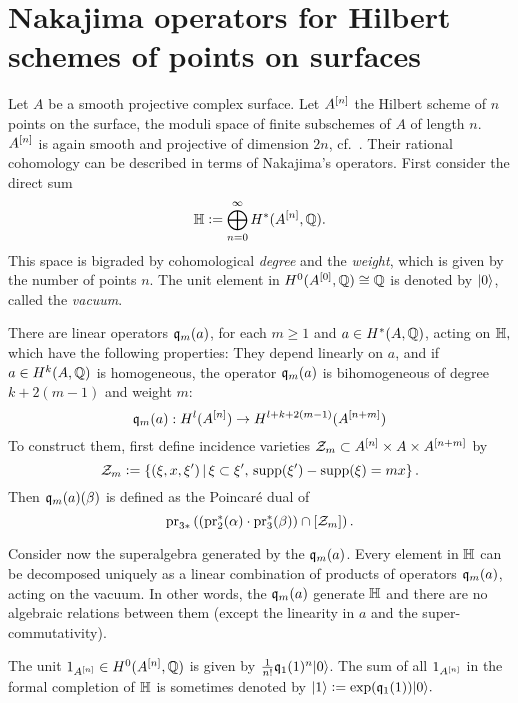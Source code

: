 \section[Nakajima operators for Hilbert schemes of points on surfaces]{Nakajima operators for Hilbert schemes of points on surfaces%
}
\label{Section_Hilbert}
Let $A$ be a smooth projective complex surface. 
Let $A^{[n]}$ the Hilbert scheme of $n$ points on the surface, \ie the moduli space of finite subschemes of $A$ of length $n$.
$A^{[n]}$ is again smooth and projective of dimension $2n$, cf.~\cite{Fogarty}. 
Their rational cohomology can be described in terms of Nakajima's \cite{Nakajima} operators. First consider the direct sum
$$
\mathbb{H} \vcentcolon=  \bigoplus_{n=0}^{\infty} H^*(A^{[n]},\mathbb{Q}).
$$
This space is bigraded by cohomological \emph{degree} and the \emph{weight}, which is given by the number of points $n$. The unit element in $H^0(A^{[0]},\mathbb{Q}) \cong \mathbb{Q}$ is denoted by $|0\rangle$, called the \emph{vacuum}.
\begin{defipro}
There are linear operators $\mathfrak{q}_m(a)$, for each $m\geq 1$ and $a \in H^*(A,\mathbb{Q})$, acting on $\mathbb{H},$ which have the following properties: They depend linearly on $a$, and if $a\in H^k(A,\mathbb{Q})$ is homogeneous, the operator $\mathfrak{q}_{m}(a)$ is bihomogeneous of degree $k+2(m-1)$ and weight $m$:
$$
\mathfrak{q}_{m}(a) : H^l(A^{[n]}) \rightarrow H^{l+k+2(m-1)}(A^{[n+m]})
$$
To construct them, first define incidence varieties $\mathcal Z_m\subset A^{[n]}\times A\times A^{[n+m]}$ by
$$
\mathcal Z_m \vcentcolon=  \left\{(\xi,x,\xi')\, |\, \xi\subset\xi',\, \operatorname{supp}(\xi') -\operatorname{supp}(\xi) = mx \right\}.
$$
Then $\mathfrak{q}_m(a)(\beta) $ is defined as the Poincar\'e dual of 
$$
\operatorname{pr}_{3*}\left( \left(\operatorname{pr}_2^*(\alpha)\cdot \operatorname{pr}_3^*(\beta)\right) \cap [\mathcal Z_m] \right).
$$
\end{defipro}
Consider now the superalgebra generated by the $\mathfrak{q}_m(a)$. 
Every element in $\mathbb{H}$ can be decomposed uniquely as a linear combination of products of operators $\mathfrak{q}_{m}(a)$, acting on the vacuum. 
In other words, the $\mathfrak{q}_m(a)$ generate $\mathbb{H}$ and there are no algebraic relations between them (except the linearity in $a$ and the super-commutativity).
\begin{example}
The unit $1_{A^{[n]}} \in H^0({A^{[n]}},\mathbb{Q})$ is given by $\frac{1}{n!}\mathfrak{q}_1(1)^n|0\rangle$. The sum of all $1_{A^{[n]}}$ in the formal completion of $\mathbb{H}$ is sometimes denoted by
$
\left|1\right> \vcentcolon=  \exp(\mathfrak{q}_1(1))|0\rangle.
$
\end{example}

